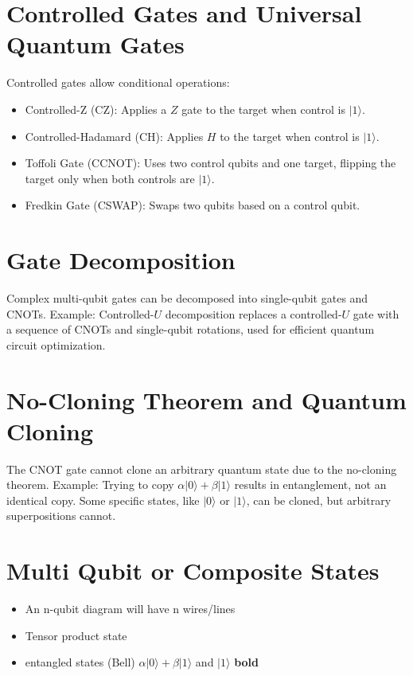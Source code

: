 \documentclass{article}
\begin{document}
\section{Controlled Gates and Universal Quantum Gates}
Controlled gates allow conditional operations:
\begin{itemize}
    \item Controlled-Z (CZ): Applies a \(Z\) gate to the target when control is \(|1\rangle\).
    \item Controlled-Hadamard (CH): Applies \(H\) to the target when control is \(|1\rangle\).
    \item Toffoli Gate (CCNOT): Uses two control qubits and one target, flipping the target only when both controls are \(|1\rangle\).
    \item Fredkin Gate (CSWAP): Swaps two qubits based on a control qubit.
\end{itemize}

\section{Gate Decomposition}
Complex multi-qubit gates can be decomposed into single-qubit gates and CNOTs. Example: Controlled-\(U\) decomposition replaces a controlled-\(U\) gate with a sequence of CNOTs and single-qubit rotations, used for efficient quantum circuit optimization.

\section{No-Cloning Theorem and Quantum Cloning}
The CNOT gate cannot clone an arbitrary quantum state due to the no-cloning theorem. Example: Trying to copy \(\alpha|0\rangle + \beta|1\rangle\) results in entanglement, not an identical copy. Some specific states, like \(|0\rangle\) or \(|1\rangle\), can be cloned, but arbitrary superpositions cannot.

\section{Multi Qubit or Composite States}
\begin{itemize}
    \item An n-qubit diagram will have n wires/lines
    \item Tensor product state
    \item entangled states (Bell) \(\alpha|0\rangle + \beta|1\rangle\)  and \(|1\rangle\) \textbf{bold}
\end{itemize}
\end{document}
